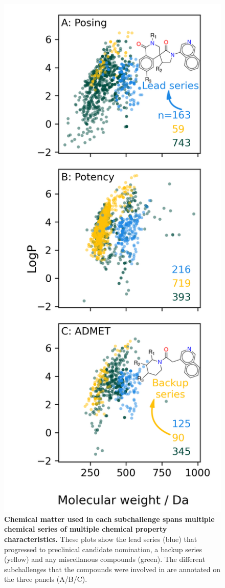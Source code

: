 \documentclass[journal=jcim,manuscript=article]{achemso}
\begin{document}
\begin{figure}
    \includegraphics[scale=0.9]{03_figs_data_preparation/subchallenge_physprops_with_scaffolds.png}
  \caption{\textbf{Chemical matter used in each subchallenge spans multiple chemical series of multiple chemical property characteristics.} These plots show the lead series (blue) that progressed to preclinical candidate nomination, a backup series (yellow) and any miscellanous compounds (green). The different subchallenges that the compounds were involved in are annotated on the three panels (A/B/C).}
  \label{fgr:physprops_scaffolds}
\end{figure}
\end{document}
